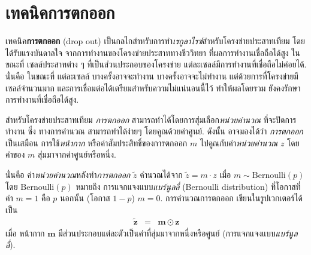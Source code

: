 %		
%		
%		
%		
%		

\section{เทคนิคการตกออก}
\label{sec: dropout}

เทคนิค\textbf{การตกออก} (drop out\cite{srivastavaEtAl2014a})
เป็นกลไกสำหรับการทำ\textit{เรกูลาไรซ์}สำหรับโครงข่ายประสาทเทียม
โดยได้รับแรงบันดาลใจ
จากการทำงานของโครงข่ายประสาททางชีววิทยา
ที่ผลการทำงานเชื่อถือได้สูง
ในขณะที่
เซลล์ประสาทต่าง ๆ ที่เป็นส่วนประกอบของโครงข่าย
แต่ละเซลล์มีการทำงานที่เชื่อถือไม่ค่อยได้.
นั่นคือ ในขณะที่ แต่ละเซลล์ บางครั้งอาจจะทำงาน บางครั้งอาจจะไม่ทำงาน
แต่ด้วยการที่โครงข่ายมีเซลล์จำนวนมาก
และการเชื่อมต่อได้เตรียมสำหรับความไม่แน่นอนนี้ไว้
ทำให้ผลโดยรวม ยังคงรักษาการทำงานที่เชื่อถือได้สูง.

สำหรับโครงข่ายประสาทเทียม
\textit{การตกออก} สามารถทำได้โดยการสุ่มเลือก\textit{หน่วยคำนวณ} ที่จะปิดการทำงาน
ซึ่ง
ทางการคำนวณ สามารถทำได้ง่ายๆ โดยคูณด้วยค่าศูนย์.
ดังนั้น อาจมองได้ว่า
\textit{การตกออก}
เป็นเสมือน
การใช้\textit{หน้ากาก} หรือค่าสัมประสิทธิ์ของการตกออก
$m$ ไปคูณกับค่า\textit{หน่วยคำนวณ} $z$
โดย ค่าของ $m$ สุ่มมาจากค่าศูนย์หรือหนึ่ง.

นั่นคือ
ค่า\textit{หน่วยคำนวณ}หลังทำ\textit{การตกออก} $\tilde{z}$
คำนวณได้จาก
$\tilde{z} = m \cdot z$
เมื่อ $m \sim \mathrm{Bernoulli}(p)$
โดย $\mathrm{Bernoulli}(p)$
หมายถึง
การแจกแจงแบบ\textit{แบร์นูลลี่} (Bernoulli distribution)
ที่โอกาสที่ค่า $m=1$ คือ $p$
นอกนั้น (โอกาส $1-p$)
$m = 0$.
%
การคำนวณการตกออก
เขียนในรูปเวกเตอร์ได้เป็น
\begin{eqnarray}
\tilde{\bm{z}}
&=& \bm{m} \odot \bm{z}
\label{eq: drop out} 
\end{eqnarray}
เมื่อ หน้ากาก $\bm{m}$ มีส่วนประกอบแต่ละตัวเป็นค่าที่สุ่มมาจากหนึ่งหรือศูนย์ (การแจกแจงแบบ\textit{แบร์นูลลี่}).

